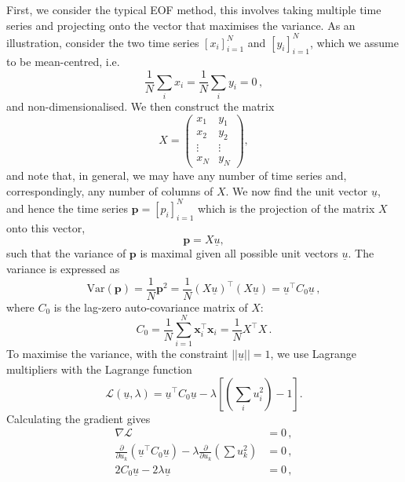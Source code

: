 First, we consider the typical EOF method, this involves taking multiple time series and projecting onto the vector that maximises the variance. As an illustration, consider the two time series $[x_i]_{i=1}^N$ and $[y_i]_{i=1}^N$, which we assume to be mean-centred, i.e. 
\begin{equation}
\frac{1}{N}\sum_i x_i = \frac{1}{N}\sum_i y_i = 0\,,
\end{equation}
and non-dimensionalised. We then construct the matrix
	\begin{equation}
		X = \left(\begin{array}{cc}
		x_1 & y_1\\
		x_2 & y_2\\
		\vdots & \vdots\\
		x_N & y_N
		\end{array}\right),
	\end{equation}
and note that, in general, we may have any number of time series and, correspondingly, any number of columns of $X$. We now find the unit vector $\underline{u}$, and hence the time series $\mathbf{p}=[p_i]_{i=1}^N$ which is the projection of the matrix $X$ onto this vector,
	\begin{equation}
		\mathbf{p} = X\underline{u},
	\end{equation}
such that the variance of $\mathbf{p}$ is maximal given all possible unit vectors $\underline{u}$. The variance is expressed as
	\begin{equation}
		\text{Var}(\mathbf{p}) = \frac{1}{N}\mathbf{p}^2 = \frac{1}{N}(X\underline{u})^\top (X\underline{u}) = \underline{u}^\top C_0 \underline{u}\,,
	\end{equation}
where $C_0$ is the lag-zero auto-covariance matrix of $X$:
	\begin{equation}
		C_0 = \frac{1}{N}\sum_{i=1}^N \mathbf{x}_i^\top\mathbf{x}_i = \frac{1}{N}X^\top X\,.
	\end{equation}
To maximise the variance, with the constraint $||\underline{u}||=1$, we use Lagrange multipliers with the Lagrange function
	\begin{equation}
		\mathcal{L}\left(\underline{u},\lambda\right) =  \underline{u}^\top C_0 \underline{u} - \lambda\left[\left(\sum_i u_i^2\right) -1\right].
	\end{equation}
Calculating the gradient gives
	\begin{align}
		\nabla\mathcal{L} &=0\,,\\
		\frac{\partial}{\partial u_k}\left(\underline{u}^\top C_0 \underline{u}\right) - \lambda\frac{\partial}{\partial u_k}\left(\sum u_k^2\right) &= 0\,, \label{eqn:2D:maxVector_EOFreg}\\
		2C_0\underline{u} - 2\lambda\underline{u} &=0\,,
	\label{eqn:AltEOF-differentiation}
	\end{align}
